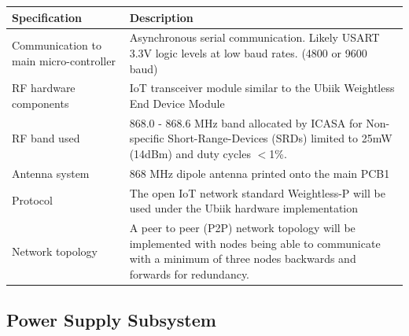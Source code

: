 \documentclass[12pt]{article}
\begin{document}
\begin{center}
  \begin{table}[!htb]
    
    \hskip-2.2cm\begin{tabular}{|p{8cm}|p{10cm}|}
        \hline
        \textbf{Specification} & \textbf{Description} \\
        \hline
        Communication to main micro-controller & Asynchronous serial communication. Likely USART 3.3V logic levels at low
        baud rates. (4800 or 9600 baud) \\[0.3cm]
        
        RF hardware components & IoT transceiver module similar to the Ubiik Weightless End Device Module \\[0.3cm]
        RF band used & 868.0 - 868.6 MHz band allocated by ICASA for Non-specific Short-Range-Devices (SRDs) limited to 
        25mW (14dBm) and duty cycles $<$1\%. \\[0.3cm]
        Antenna system & 868 MHz dipole antenna printed onto the main PCB1 \\[0.3cm]
        Protocol & The open IoT network standard Weightless-P will be used under the Ubiik hardware
        implementation \\[0.3cm]
        Network topology & A peer to peer (P2P) network topology will be implemented with nodes being able to communicate
        with a minimum of three nodes backwards and forwards for redundancy.\\[0.3cm]

        \hline

    \end{tabular}    
    
    \label{tab:summary_measurments}
   \end{table}
\end{center}


\subsection{Power Supply Subsystem}
\end{document}
